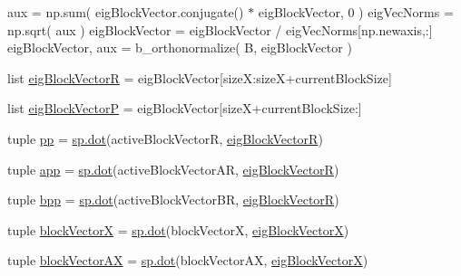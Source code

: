 \begin{DoxyCompactItemize}
\begin{DoxyCompactList}
aux = np.\+sum( eig\+Block\+Vector.\+conjugate() $\ast$ eig\+Block\+Vector, 0 ) eig\+Vec\+Norms = np.\+sqrt( aux ) eig\+Block\+Vector = eig\+Block\+Vector / eig\+Vec\+Norms\mbox{[}np.\+newaxis,\+:\mbox{]} eig\+Block\+Vector, aux = b\+\_\+orthonormalize( B, eig\+Block\+Vector ) \end{DoxyCompactList}\item 
list \hyperlink{namespacescipy_1_1sparse_1_1linalg_1_1eigen_1_1lobpcg_1_1lobpcg_ac8795baf14a0d28960429f9f9938558b}{eig\+Block\+Vector\+R} = eig\+Block\+Vector\mbox{[}size\+X\+:size\+X+current\+Block\+Size\mbox{]}
\item 
list \hyperlink{namespacescipy_1_1sparse_1_1linalg_1_1eigen_1_1lobpcg_1_1lobpcg_a1bcbfc8b9d54d16b70d9f20eb58ae9d9}{eig\+Block\+Vector\+P} = eig\+Block\+Vector\mbox{[}size\+X+current\+Block\+Size\+:\mbox{]}
\item 
tuple \hyperlink{namespacescipy_1_1sparse_1_1linalg_1_1eigen_1_1lobpcg_1_1lobpcg_ae9bf54322e073125cfc164421e46e06f}{pp} = \hyperlink{vecdot_8cc_af747d922978de16d142e896d61057e8a}{sp.\+dot}(active\+Block\+Vector\+R, \hyperlink{namespacescipy_1_1sparse_1_1linalg_1_1eigen_1_1lobpcg_1_1lobpcg_ac8795baf14a0d28960429f9f9938558b}{eig\+Block\+Vector\+R})
\item 
tuple \hyperlink{namespacescipy_1_1sparse_1_1linalg_1_1eigen_1_1lobpcg_1_1lobpcg_a4543341ba5b5f6b9492a4bee372afd63}{app} = \hyperlink{vecdot_8cc_af747d922978de16d142e896d61057e8a}{sp.\+dot}(active\+Block\+Vector\+A\+R, \hyperlink{namespacescipy_1_1sparse_1_1linalg_1_1eigen_1_1lobpcg_1_1lobpcg_ac8795baf14a0d28960429f9f9938558b}{eig\+Block\+Vector\+R})
\item 
tuple \hyperlink{namespacescipy_1_1sparse_1_1linalg_1_1eigen_1_1lobpcg_1_1lobpcg_abaa6fe0404849ed36f2bd404d5fc0a54}{bpp} = \hyperlink{vecdot_8cc_af747d922978de16d142e896d61057e8a}{sp.\+dot}(active\+Block\+Vector\+B\+R, \hyperlink{namespacescipy_1_1sparse_1_1linalg_1_1eigen_1_1lobpcg_1_1lobpcg_ac8795baf14a0d28960429f9f9938558b}{eig\+Block\+Vector\+R})
\item 
tuple \hyperlink{namespacescipy_1_1sparse_1_1linalg_1_1eigen_1_1lobpcg_1_1lobpcg_a894c527a60b3b2e0ec5e006148942207}{block\+Vector\+X} = \hyperlink{vecdot_8cc_af747d922978de16d142e896d61057e8a}{sp.\+dot}(block\+Vector\+X, \hyperlink{namespacescipy_1_1sparse_1_1linalg_1_1eigen_1_1lobpcg_1_1lobpcg_adfc3268862aad3537c08b6ce4c2385a8}{eig\+Block\+Vector\+X})
\item 
tuple \hyperlink{namespacescipy_1_1sparse_1_1linalg_1_1eigen_1_1lobpcg_1_1lobpcg_adc03b908eb348e4692b522fcd141b34d}{block\+Vector\+A\+X} = \hyperlink{vecdot_8cc_af747d922978de16d142e896d61057e8a}{sp.\+dot}(block\+Vector\+A\+X, \hyperlink{namespacescipy_1_1sparse_1_1linalg_1_1eigen_1_1lobpcg_1_1lobpcg_adfc3268862aad3537c08b6ce4c2385a8}{eig\+Block\+Vector\+X})

\end{DoxyCompactItemize}
